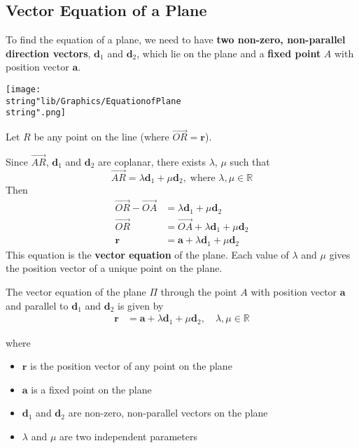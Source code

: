 \documentclass[11pt,a4paper]{book}
\newcommand{\R}{\mathbb{R}}
\begin{document}
\subsection{Vector Equation of a Plane}

To find the equation of a plane, we need to have \textbf{two non-zero,
non-parallel direction vectors}, $\textbf{d}_{1}$ and $\textbf{d}_{2}$,
which lie on the plane and a \textbf{fixed point} $A$ with position
vector $\textbf{a}$.
\begin{center}
\texttt{[image: \\string"lib/Graphics/EquationofPlane\\string".png]}
\par\end{center}

Let $R$ be any point on the line (where $\overrightarrow{OR}=\textbf{r}$).

Since $\overrightarrow{AR}$, $\textbf{d}_{1}$ and $\textbf{d}_{2}$
are coplanar, there exists $\lambda$, $\mu$ such that
\[
\overrightarrow{AR}=\lambda\textbf{d}_{1}+\mu\textbf{d}_{2},\;\text{where }\lambda,\mu\in\R
\]
Then
\begin{align*}
\overrightarrow{OR}-\overrightarrow{OA} & =\lambda\textbf{d}_{1}+\mu\textbf{d}_{2}\\
\overrightarrow{OR} & =\overrightarrow{OA}+\lambda\textbf{d}_{1}+\mu\textbf{d}_{2}\\
\textbf{r} & =\textbf{a}+\lambda\textbf{d}_{1}+\mu\textbf{d}_{2}
\end{align*}
This equation is the \textbf{vector equation} of the plane. Each value
of $\lambda$ and $\mu$ gives the position vector of a unique point
on the plane.

\begin{tcolorbox}[colback=blue!5, colframe=black, boxrule=.4pt, sharpish corners]

The vector equation of the plane $\Pi$ through the point $A$ with
position vector $\textbf{a}$ and parallel to $\textbf{d}_{1}$ and
$\textbf{d}_{2}$ is given by
\begin{align*}
\textbf{r} & =\textbf{a}+\lambda\textbf{d}_{1}+\mu\textbf{d}_{2},\quad\lambda,\mu\in\R
\end{align*}

where
\begin{itemize}
\item $\textbf{r}$ is the position vector of any point on the plane
\item $\textbf{a}$ is a fixed point on the plane
\item $\textbf{d}_{1}$ and $\textbf{d}_{2}$ are non-zero, non-parallel
vectors on the plane
\item $\lambda$ and $\mu$ are two independent parameters
\end{itemize}
\end{tcolorbox}
\end{document}
